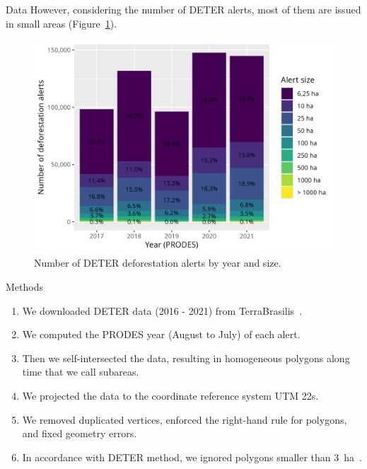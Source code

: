 \documentclass[20pt]{beamer}
\begin{document}
\begin{frame}[fragile,t]
\begin{columns}[t]
\begin{column}{0.33\linewidth}
\begin{block}{Data}
        However, considering the number of DETER alerts, most of them are issued in small areas (Figure~\ref{fig:deter_warnings_size}).

\begin{figure}[h] 
    \begin{center}
    \includegraphics[width=\linewidth]{./figures/deter_warnings_size.png}
    \caption{Number of DETER deforestation alerts by year and size.}
    \label{fig:deter_warnings_size}
    \end{center}
\end{figure}

    \end{block}

\vspace{0.5cm}

    \begin{block}{Methods}
        \vspace{0.5cm}
        \begin{enumerate}
            \item We downloaded DETER data (2016 - 2021) from TerraBrasilis~\cite{f.g.assis2019}. 
            \item We computed the PRODES year (August to July) of each alert.
            \item Then we self-intersected the data, resulting in homogeneous polygons along time that we call subareas.
            \item We projected the data to the coordinate reference system UTM 22s.
            \item We removed duplicated vertices, enforced the right-hand rule for polygons, and fixed geometry errors.
            \item In accordance with DETER method, we ignored polygons smaller than 3~ha~\cite{dealmeida2022}.
        \end{enumerate}
        \vspace{0.3cm}
    \end{block}


\end{column}
\end{columns}
\end{frame}
\end{document}
